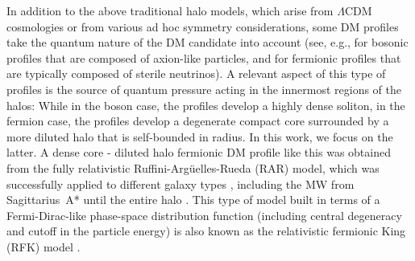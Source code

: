 \documentclass[twocolumn]{aa}
\begin{document}
In addition to the above traditional halo models, which arise from $\Lambda$CDM cosmologies or from various ad hoc symmetry considerations, some DM profiles take the quantum nature of the DM candidate into account (see, e.g., \cite{2014NatPh..10..496S} for bosonic profiles that are composed of axion-like particles, and \cite{2015MNRAS.451..622R,2015PhRvD..92l3527C,2021MNRAS.502.4227A} for fermionic profiles that are typically composed of sterile neutrinos). A relevant aspect of this type of profiles is the source of quantum pressure acting in the innermost regions of the halos: While in the boson case, the profiles develop a highly dense soliton, in the fermion case, the profiles develop a degenerate compact core surrounded by a more diluted halo that is self-bounded in radius. In this work, we focus on the latter. A dense core - diluted halo fermionic DM profile like this was obtained from the fully relativistic Ruffini-Argüelles-Rueda (RAR) model, which was successfully applied to different galaxy types \citep{2019PDU....24..278A,2023ApJ...945....1K}, including the MW from Sagittarius~A* until the entire halo \citep{arguelles_novel_2018,2020A&A...641A..34B,2021MNRAS.505L..64B,2022MNRAS.511L..35A}.
This type of model built in terms of a Fermi-Dirac-like phase-space distribution function (including central degeneracy and cutoff in the particle energy) is also known as the relativistic fermionic King (RFK) model \citep{2022PhRvD.106d3538C}.

\end{document}
